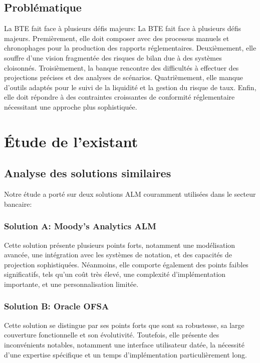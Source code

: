\documentclass[12pt,a4paper]{report}
\begin{document}
\subsection{Problématique}
La BTE fait face à plusieurs défis majeurs:
La BTE fait face à plusieurs défis majeurs. Premièrement, elle doit composer avec des processus manuels et chronophages pour la production des rapports réglementaires. Deuxièmement, elle souffre d'une vision fragmentée des risques de bilan due à des systèmes cloisonnés. Troisièmement, la banque rencontre des difficultés à effectuer des projections précises et des analyses de scénarios. Quatrièmement, elle manque d'outils adaptés pour le suivi de la liquidité et la gestion du risque de taux. Enfin, elle doit répondre à des contraintes croissantes de conformité réglementaire nécessitant une approche plus sophistiquée.

\section{Étude de l'existant}

\subsection{Analyse des solutions similaires}
Notre étude a porté sur deux solutions ALM couramment utilisées dans le secteur bancaire:

\subsubsection{Solution A: Moody's Analytics ALM}
Cette solution présente plusieurs points forts, notamment une modélisation avancée, une intégration avec les systèmes de notation, et des capacités de projection sophistiquées. Néanmoins, elle comporte également des points faibles significatifs, tels qu'un coût très élevé, une complexité d'implémentation importante, et une personnalisation limitée.

\subsubsection{Solution B: Oracle OFSA}
Cette solution se distingue par ses points forts que sont sa robustesse, sa large couverture fonctionnelle et son évolutivité. Toutefois, elle présente des inconvénients notables, notamment une interface utilisateur datée, la nécessité d'une expertise spécifique et un temps d'implémentation particulièrement long.
\end{document}
